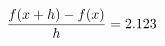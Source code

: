 \documentclass[preview]{standalone}
\begin{document}
\begin{align*}
\special{dvisvgm:raw <g id='unique000'>}\frac{f(x+h)-f(x)}{h} = 2.123\special{dvisvgm:raw </g>}
\end{align*}
\end{document}

